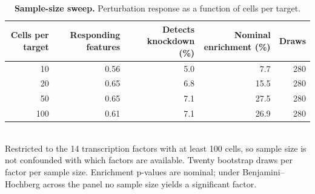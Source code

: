 \begin{table}[htbp]
\centering
\caption{\textbf{Sample-size sweep.} Perturbation response as a function of cells per target.}
\label{tab:sweep}
\smallskip
\small
\begin{tabular}{rrrrr}
\toprule
Cells per target & Responding features & Detects knockdown (\%) & Nominal enrichment (\%) & Draws \\
\midrule
10 & 0.56 & 5.0 & 7.7 & 280 \\
20 & 0.65 & 6.8 & 15.5 & 280 \\
50 & 0.65 & 7.1 & 27.5 & 280 \\
100 & 0.61 & 7.1 & 26.9 & 280 \\
\bottomrule
\end{tabular}
\\[2pt]
\footnotesize Restricted to the 14 transcription factors with at least 100 cells, so sample size is not confounded with which factors are available. Twenty bootstrap draws per factor per sample size. Enrichment p-values are nominal; under Benjamini--Hochberg across the panel no sample size yields a significant factor.
\end{table}

